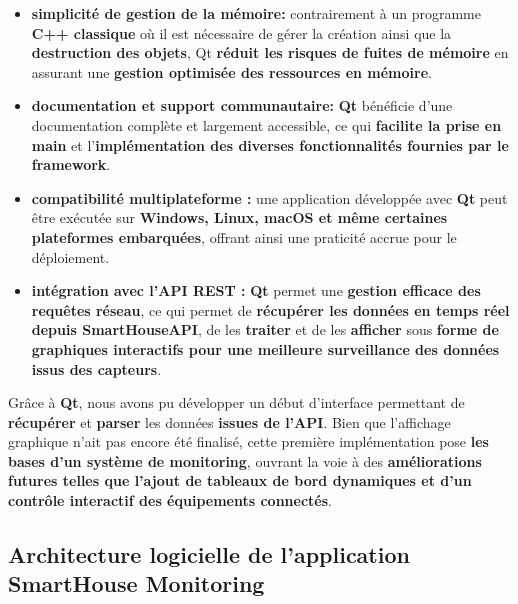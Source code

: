 \documentclass[10pt, a4paper]{report}
\begin{document}
	\begin{itemize}
		\item \textbf{simplicité de gestion de la mémoire: } contrairement à un programme \textbf{C++ classique} où il est nécessaire de gérer la création ainsi que la \textbf{destruction des objets}, Qt \textbf{réduit les risques de fuites de mémoire} en assurant une \textbf{gestion optimisée des ressources en mémoire}.
		
		\item \textbf{documentation et support communautaire:}  \textbf{Qt} bénéficie d’une documentation complète et largement accessible, ce qui \textbf{facilite la prise en main} et l’\textbf{implémentation des diverses fonctionnalités fournies par le framework}. 
		
		\item \textbf{compatibilité multiplateforme :} une application développée avec \textbf{Qt} peut être exécutée sur\textbf{ Windows, Linux, macOS et même certaines plateformes embarquées}, offrant ainsi une praticité accrue pour le déploiement.
		
		\item \textbf{intégration avec l’API REST :} \textbf{Qt} permet une\textbf{ gestion efficace des requêtes réseau}, ce qui permet de \textbf{récupérer les données en temps réel depuis SmartHouseAPI}, de les \textbf{traiter} et de les \textbf{afficher} sous \textbf{forme de graphiques interactifs pour une meilleure surveillance des données issus des capteurs}.
	\end{itemize}
	
	\vspace{0.5cm}
	Grâce à \textbf{Qt}, nous avons pu développer un début d’interface permettant de \textbf{récupérer} et \textbf{parser} les données \textbf{issues de l’API}. Bien que l’affichage graphique n’ait pas encore été finalisé, cette première implémentation pose \textbf{les bases d’un système de monitoring}, ouvrant la voie à des \textbf{améliorations futures telles que l’ajout de tableaux de bord dynamiques et d’un contrôle interactif des équipements connectés}.
	
	\subsection{Architecture logicielle de l'application SmartHouse Monitoring}	
	
\end{document}

